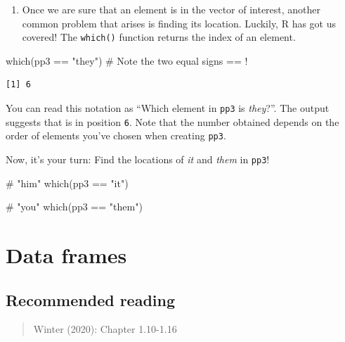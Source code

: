 \documentclass[
  11pt,
  letterpaper,
  DIV=11,
  numbers=noendperiod]{scrreprt}
\newenvironment{Shaded}{\begin{snugshade}}{\end{snugshade}}
\newcommand{\CommentTok}[1]{\textcolor[rgb]{0.37,0.37,0.37}{#1}}
\newcommand{\FunctionTok}[1]{\textcolor[rgb]{0.28,0.35,0.67}{#1}}
\newcommand{\NormalTok}[1]{\textcolor[rgb]{0.00,0.23,0.31}{#1}}
\newcommand{\SpecialCharTok}[1]{\textcolor[rgb]{0.37,0.37,0.37}{#1}}
\newcommand{\StringTok}[1]{\textcolor[rgb]{0.13,0.47,0.30}{#1}}
\providecommand{\tightlist}{%
  \setlength{\itemsep}{0pt}\setlength{\parskip}{0pt}}\usepackage{longtable,booktabs,array}
\begin{document}
\begin{enumerate}
\def\labelenumi{\arabic{enumi}.}
\setcounter{enumi}{3}
\tightlist
\item
  Once we are sure that an element is in the vector of interest, another
  common problem that arises is finding its location. Luckily, R has got
  us covered! The \texttt{which()} function returns the index of an
  element.
\end{enumerate}

\begin{Shaded}
\begin{Highlighting}[]
\FunctionTok{which}\NormalTok{(pp3 }\SpecialCharTok{==} \StringTok{"they"}\NormalTok{) }\CommentTok{\# Note the two equal signs == !}
\end{Highlighting}
\end{Shaded}

\begin{verbatim}
[1] 6
\end{verbatim}

You can read this notation as ``Which element in \texttt{pp3} is
\emph{they}?''. The output suggests that is in position \texttt{6}. Note
that the number obtained depends on the order of elements you've chosen
when creating \texttt{pp3}.

Now, it's your turn: Find the locations of \emph{it} and \emph{them} in
\texttt{pp3}!

\begin{Shaded}
\begin{Highlighting}[]
\CommentTok{\# "him"}
\FunctionTok{which}\NormalTok{(pp3 }\SpecialCharTok{==} \StringTok{"it"}\NormalTok{)}

\CommentTok{\# "you"}
\FunctionTok{which}\NormalTok{(pp3 }\SpecialCharTok{==} \StringTok{"them"}\NormalTok{)}
\end{Highlighting}
\end{Shaded}

\chapter{Data frames}\label{data-frames}

\section{Recommended reading}\label{recommended-reading-1}

\begin{quote}
Winter (2020): Chapter 1.10-1.16
\end{quote}
\end{document}
